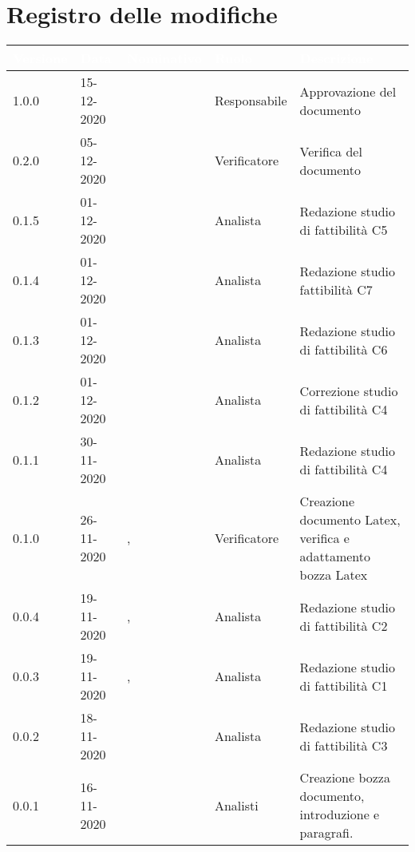 \section*{Registro delle modifiche}
{
\renewcommand{\arraystretch}{1.5}
\centering
\begin{longtable}{C{2cm} C{2.5cm} C{3cm} C{2.5cm} C{5cm}}
\textcolor{white}{\textbf{Versione}}&
\textcolor{white}{\textbf{Data}}&
\textcolor{white}{\textbf{Nominativo}}&
\textcolor{white}{\textbf{Ruolo}}&
\textcolor{white}{\textbf{Descrizione}}\\	
\endhead

1.0.0 & 15-12-2020 & \SG{} & Responsabile & Approvazione del documento\\  
0.2.0 & 05-12-2020 & \BM{} & Verificatore & Verifica del documento\\
0.1.5 & 01-12-2020 & \SH{} & Analista & Redazione studio di fattibilità C5 \\
0.1.4 & 01-12-2020 & \PA{} & Analista & Redazione studio fattibilità C7\\
0.1.3 & 01-12-2020 & \RA{} & Analista & Redazione studio di fattibilità C6\\
0.1.2 & 01-12-2020 & \ZM{} & Analista & Correzione studio di fattibilità C4\\
0.1.1 & 30-11-2020 & \ZM{} & Analista & Redazione studio di fattibilità C4\\
0.1.0 & 26-11-2020 & \SG{}, \BM{} & Verificatore & Creazione documento Latex, verifica e adattamento bozza Latex \\
0.0.4 & 19-11-2020 & \ZM{}, \SP{} & Analista & Redazione studio di fattibilità C2\\
0.0.3 & 19-11-2020 & \ZM{}, \SP{} & Analista & Redazione studio di fattibilità C1\\		
0.0.2 & 18-11-2020 & \PA{} & Analista & Redazione studio di fattibilità C3\\
0.0.1 & 16-11-2020 & \Gruppo{} & Analisti & Creazione bozza documento, introduzione e paragrafi. \\	
\end{longtable}
}
